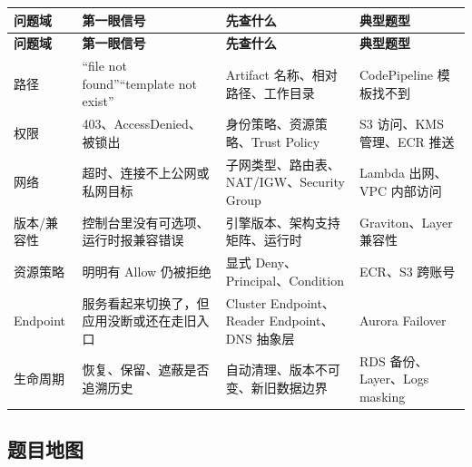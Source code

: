 \documentclass[12pt,a4paper]{article}
\begin{document}
\begin{longtable}{L{2.2cm}L{3.5cm}L{3.9cm}L{3.9cm}}
\textbf{问题域} & \textbf{第一眼信号} & \textbf{先查什么} & \textbf{典型题型} \\
\midrule
\endfirsthead
{}
\textbf{问题域} & \textbf{第一眼信号} & \textbf{先查什么} & \textbf{典型题型} \\
\midrule
\endhead
路径 & “file not found”“template not exist” & Artifact 名称、相对路径、工作目录 & CodePipeline 模板找不到 \\
权限 & 403、AccessDenied、被锁出 & 身份策略、资源策略、Trust Policy & S3 访问、KMS 管理、ECR 推送 \\
网络 & 超时、连接不上公网或私网目标 & 子网类型、路由表、NAT/IGW、Security Group & Lambda 出网、VPC 内部访问 \\
版本/兼容性 & 控制台里没有可选项、运行时报兼容错误 & 引擎版本、架构支持矩阵、运行时 & Graviton、Layer 兼容性 \\
资源策略 & 明明有 Allow 仍被拒绝 & 显式 Deny、Principal、Condition & ECR、S3 跨账号 \\
Endpoint & 服务看起来切换了，但应用没断或还在走旧入口 & Cluster Endpoint、Reader Endpoint、DNS 抽象层 & Aurora Failover \\
生命周期 & 恢复、保留、遮蔽是否追溯历史 & 自动清理、版本不可变、新旧数据边界 & RDS 备份、Layer、Logs masking \\
\bottomrule
\end{longtable}

\subsection{题目地图}
\end{document}

